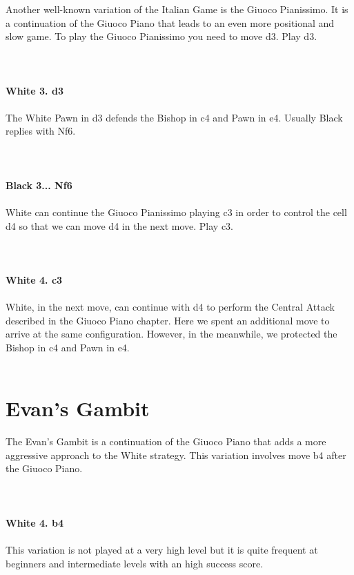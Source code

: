 \documentclass{article}
\begin{document}
Another well-known variation of the Italian Game is the Giuoco Pianissimo. It is a continuation of the Giuoco Piano that leads to an even more positional and slow game. To play the Giuoco Pianissimo you need to move d3. Play d3.\\
\\

\\
\\
\textbf{White 3. d3}\\
\\
The White Pawn in d3 defends the Bishop in c4 and Pawn in e4. Usually Black replies with Nf6.\\
\\

\\
\\
\textbf{Black 3... Nf6}\\
\\
White can continue the Giuoco Pianissimo playing c3 in order to control the cell d4 so that we can move d4 in the next move. Play c3.\\
\\

\\
\\
\textbf{White 4. c3}\\
\\
White, in the next move, can continue with d4 to perform the Central Attack described in the Giuoco Piano chapter. Here we spent an additional move to arrive at the same configuration. However, in the meanwhile, we protected the Bishop in c4 and Pawn in e4.\\
\\
\section{ Evan's Gambit}

The Evan's Gambit is a continuation of the Giuoco Piano that adds a more aggressive approach to the White strategy. This variation involves move b4 after the Giuoco Piano.\\
\\

\\
\\
\textbf{White 4. b4}\\
\\
This variation is not played at a very high level but it is quite frequent at beginners and intermediate levels with an high success score.\\
\\
\end{document}
